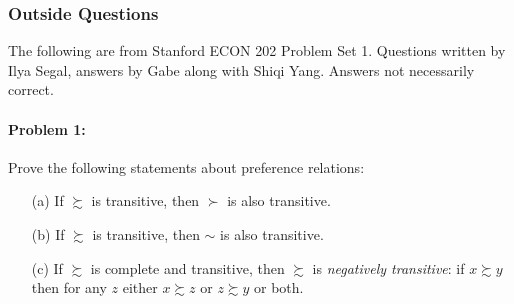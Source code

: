 \documentclass[12pt]{article}
\begin{document}
\subsubsection{Outside Questions}

The following are from Stanford ECON 202 Problem Set 1. Questions written by Ilya Segal, answers by Gabe along with Shiqi Yang. Answers not necessarily correct.


\paragraph{Problem 1:} Prove the following statements about preference relations:

\begin{itemize}
    \item[(a)] If $\succsim$ is transitive, then $\succ$ is also transitive.

    \item[(b)] If $\succsim$ is transitive, then $\sim$ is also transitive.

    \item[(c)] If $\succsim$ is complete and transitive, then $\succsim$ is \emph{negatively transitive}: if $x \succsim y$ then for any $z$ either $x \succsim z$ or $z \succsim y$ or both.
\end{itemize}

\medskip
\end{document}
